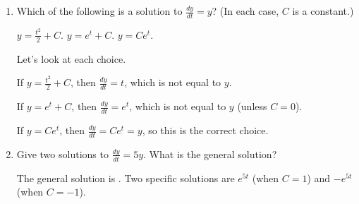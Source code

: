 \documentclass[main]{subfiles}
\begin{document}
\begin{enumerate}
\pspace{\newpage}


Problems 2, 3, and 4 are about solutions to differential equations.


\item  \label{diffeq-sol-check-1}

  
  \begin{problem}[2in]
    Which of the following is a solution to $\frac{dy}{dt} = y$? (In each case, $C$ is a constant.)    
    \begin{enumerate}[label=\protect\maybecircle{\roman*.}]
    \plainitem $y = \frac{t^2}{2} + C$.
    \plainitem $y = e^t + C$.
    \circleitem $y = Ce^t$.
    \end{enumerate}
  \end{problem}

  \begin{solution}
    Let's look at each choice.

    If $y = \frac{t^2}{2} + C$, then $\frac{dy}{dt} = t$, which is not
    equal to $y$.  
    
    If $y = e^t + C$, then $\frac{dy}{dt} = e^t$, which is not equal to
    $y$ (unless $C = 0$).

    If $y = Ce^t$, then $\frac{dy}{dt} = Ce^t = y$, so this is the correct
    choice. 
  \end{solution}  

\item 

  
  \begin{problem}[2in]
    Give two solutions to $\frac{dy}{dt} = 5y$. What is the general
    solution?
  \end{problem}

  \begin{solution}
    The general solution is .  Two specific solutions are
    $e^{5t}$ (when $C = 1$) and $-e^{5t}$ (when $C = -1$).
  \end{solution}


\end{enumerate}
\end{document}
